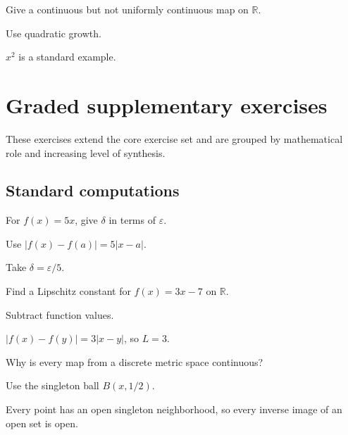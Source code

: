 \begin{exercise}\label{exr:ii05-08}
Give a continuous but not uniformly continuous map on $\mathbb R$.
\end{exercise}
\begin{hint}
Use quadratic growth.
\end{hint}
\begin{solution}
$x^2$ is a standard example.
\end{solution}


\section{Graded supplementary exercises}
These exercises extend the core exercise set and are grouped by mathematical role and increasing level of synthesis.

\subsection*{Standard computations}

\begin{exercise}\label{exr:ii05-expand-01}
For \(f(x)=5x\), give \(\delta\) in terms of \(\varepsilon\).
\end{exercise}
\begin{hint}
Use \(|f(x)-f(a)|=5|x-a|\).
\end{hint}
\begin{solution}
Take \(\delta=\varepsilon/5\).
\end{solution}

\begin{exercise}\label{exr:ii05-expand-02}
Find a Lipschitz constant for \(f(x)=3x-7\) on \(\mathbb R\).
\end{exercise}
\begin{hint}
Subtract function values.
\end{hint}
\begin{solution}
\(|f(x)-f(y)|=3|x-y|\), so \(L=3\).
\end{solution}

\begin{exercise}\label{exr:ii05-expand-03}
Why is every map from a discrete metric space continuous?
\end{exercise}
\begin{hint}
Use the singleton ball \(B(x,1/2)\).
\end{hint}
\begin{solution}
Every point has an open singleton neighborhood, so every inverse image of an open set is open.
\end{solution}

